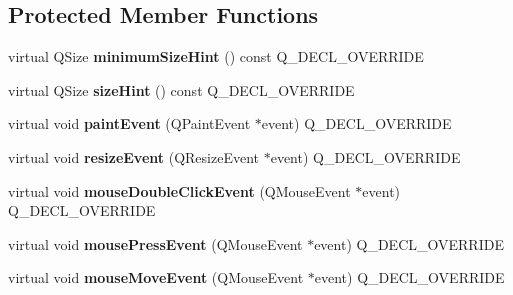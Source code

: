 \subsection*{Protected Member Functions}
\begin{DoxyCompactItemize}
\item 
virtual Q\+Size {\bfseries minimum\+Size\+Hint} () const Q\+\_\+\+D\+E\+C\+L\+\_\+\+O\+V\+E\+R\+R\+I\+DE\hypertarget{class_q_custom_plot_a968a01cd4077d63aecde1aef1db057fc}{}\label{class_q_custom_plot_a968a01cd4077d63aecde1aef1db057fc}

\item 
virtual Q\+Size {\bfseries size\+Hint} () const Q\+\_\+\+D\+E\+C\+L\+\_\+\+O\+V\+E\+R\+R\+I\+DE\hypertarget{class_q_custom_plot_ac9d6fe101e082daf756903b11f6e6213}{}\label{class_q_custom_plot_ac9d6fe101e082daf756903b11f6e6213}

\item 
virtual void {\bfseries paint\+Event} (Q\+Paint\+Event $\ast$event) Q\+\_\+\+D\+E\+C\+L\+\_\+\+O\+V\+E\+R\+R\+I\+DE\hypertarget{class_q_custom_plot_a8068b368e5813065ee0f4cf7c6d21330}{}\label{class_q_custom_plot_a8068b368e5813065ee0f4cf7c6d21330}

\item 
virtual void {\bfseries resize\+Event} (Q\+Resize\+Event $\ast$event) Q\+\_\+\+D\+E\+C\+L\+\_\+\+O\+V\+E\+R\+R\+I\+DE\hypertarget{class_q_custom_plot_af5b69dc6a431562ecdd1d0718bcbdf70}{}\label{class_q_custom_plot_af5b69dc6a431562ecdd1d0718bcbdf70}

\item 
virtual void {\bfseries mouse\+Double\+Click\+Event} (Q\+Mouse\+Event $\ast$event) Q\+\_\+\+D\+E\+C\+L\+\_\+\+O\+V\+E\+R\+R\+I\+DE\hypertarget{class_q_custom_plot_a344075e6e80ed6d575c79b81694abb8a}{}\label{class_q_custom_plot_a344075e6e80ed6d575c79b81694abb8a}

\item 
virtual void {\bfseries mouse\+Press\+Event} (Q\+Mouse\+Event $\ast$event) Q\+\_\+\+D\+E\+C\+L\+\_\+\+O\+V\+E\+R\+R\+I\+DE\hypertarget{class_q_custom_plot_aac0a7296a6031dc667c01c1abd4ecc6b}{}\label{class_q_custom_plot_aac0a7296a6031dc667c01c1abd4ecc6b}

\item 
virtual void {\bfseries mouse\+Move\+Event} (Q\+Mouse\+Event $\ast$event) Q\+\_\+\+D\+E\+C\+L\+\_\+\+O\+V\+E\+R\+R\+I\+DE\hypertarget{class_q_custom_plot_ae7abdc93b26d2ad4632c1ab75ae5b46f}{}\label{class_q_custom_plot_ae7abdc93b26d2ad4632c1ab75ae5b46f}


\end{DoxyCompactItemize}
